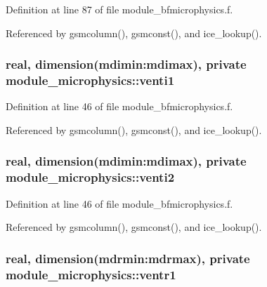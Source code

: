 Definition at line 87 of file module\+\_\+bfmicrophysics.\+f.



Referenced by gsmcolumn(), gsmconst(), and ice\+\_\+lookup().

\subsubsection[{\texorpdfstring{venti1}{venti1}}]{\setlength{\rightskip}{0pt plus 5cm}real, dimension(mdimin\+:mdimax), private module\+\_\+microphysics\+::venti1\hspace{0.3cm}{\ttfamily [private]}}\hypertarget{namespacemodule__microphysics_a420fb71de46ebdf9a097147bf9f9debe}{}\label{namespacemodule__microphysics_a420fb71de46ebdf9a097147bf9f9debe}


Definition at line 46 of file module\+\_\+bfmicrophysics.\+f.



Referenced by gsmcolumn(), gsmconst(), and ice\+\_\+lookup().

\subsubsection[{\texorpdfstring{venti2}{venti2}}]{\setlength{\rightskip}{0pt plus 5cm}real, dimension(mdimin\+:mdimax), private module\+\_\+microphysics\+::venti2\hspace{0.3cm}{\ttfamily [private]}}\hypertarget{namespacemodule__microphysics_a340e6633b234e32289115c3ff08277c5}{}\label{namespacemodule__microphysics_a340e6633b234e32289115c3ff08277c5}


Definition at line 46 of file module\+\_\+bfmicrophysics.\+f.



Referenced by gsmcolumn(), gsmconst(), and ice\+\_\+lookup().

\subsubsection[{\texorpdfstring{ventr1}{ventr1}}]{\setlength{\rightskip}{0pt plus 5cm}real, dimension(mdrmin\+:mdrmax), private module\+\_\+microphysics\+::ventr1\hspace{0.3cm}{\ttfamily [private]}}\hypertarget{namespacemodule__microphysics_a17a8a4c24d0e7bd36c202103141dc1f8}{}\label{namespacemodule__microphysics_a17a8a4c24d0e7bd36c202103141dc1f8}


